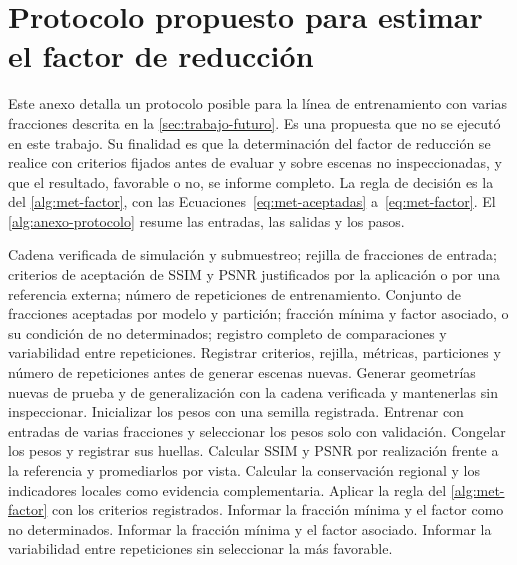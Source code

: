 \renewcommand{\appendixname}{Anexo}

\chapter{Protocolo propuesto para estimar el factor de reducción}
\label{chap:anexo-protocolo}

Este anexo detalla un protocolo posible para la línea de entrenamiento con varias fracciones descrita en la \cref{sec:trabajo-futuro}. Es una propuesta que no se ejecutó en este trabajo. Su finalidad es que la determinación del factor de reducción se realice con criterios fijados antes de evaluar y sobre escenas no inspeccionadas, y que el resultado, favorable o no, se informe completo. La regla de decisión es la del \cref{alg:met-factor}, con las Ecuaciones~\eqref{eq:met-aceptadas} a~\eqref{eq:met-factor}. El \cref{alg:anexo-protocolo} resume las entradas, las salidas y los pasos.

\begin{algorithm}[htbp]\small
\caption{Protocolo prospectivo propuesto para estimar el factor de reducción.}\label{alg:anexo-protocolo}
\begin{algorithmic}[1]
\Require Cadena verificada de simulación y submuestreo; rejilla de fracciones de entrada; criterios de aceptación de SSIM y PSNR justificados por la aplicación o por una referencia externa; número de repeticiones de entrenamiento.
\Ensure Conjunto de fracciones aceptadas por modelo y partición; fracción mínima y factor asociado, o su condición de no determinados; registro completo de comparaciones y variabilidad entre repeticiones.
\State Registrar criterios, rejilla, métricas, particiones y número de repeticiones antes de generar escenas nuevas.
\State Generar geometrías nuevas de prueba y de generalización con la cadena verificada y mantenerlas sin inspeccionar.
\State Inicializar los pesos con una semilla registrada.
\State Entrenar con entradas de varias fracciones y seleccionar los pesos solo con validación.
\State Congelar los pesos y registrar sus huellas.
\EndFor
{}
\State Calcular SSIM y PSNR por realización frente a la referencia y promediarlos por vista.
\State Calcular la conservación regional y los indicadores locales como evidencia complementaria.
\EndFor
{}
\State Aplicar la regla del \cref{alg:met-factor} con los criterios registrados.
\State Informar la fracción mínima y el factor como no determinados.
\Else
\State Informar la fracción mínima y el factor asociado.
\EndIf
\EndFor
\State Informar la variabilidad entre repeticiones sin seleccionar la más favorable.
\end{algorithmic}\end{algorithm}
